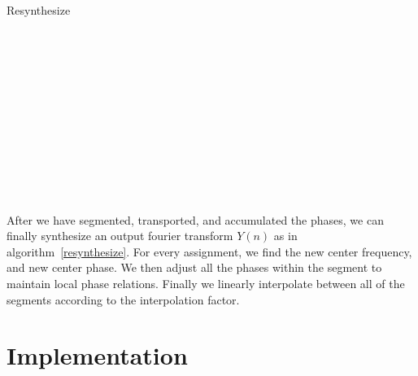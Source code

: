 \documentclass[12pt]{article}
\begin{document}
\begin{algorithm}
  \caption{Resynthesize}\label{resynthesize}
\begin{algorithmic}
\\
\EndFor
\\
  \\
  \\
    \\
    \\
    \\
  \EndFor

    \\
    \\
    \\
  \EndFor
\EndFor
\end{algorithmic}
\end{algorithm}


After we have segmented, transported, and accumulated the phases, we can finally synthesize an output fourier transform $Y(n)$ as in algorithm~\ref{resynthesize}.
For every assignment, we find the new center frequency, and new center phase.
We then adjust all the phases within the segment to maintain local phase relations.
Finally we linearly interpolate between all of the segments according to the interpolation factor.

\section{Implementation}
\end{document}
